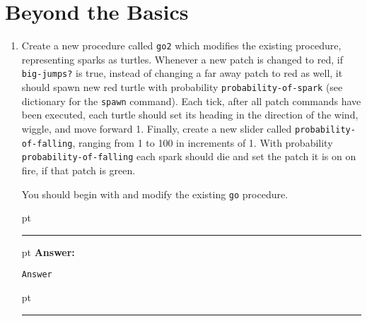 \documentclass[11pt,oneside]{book}
\begin{document}
\section{Beyond the Basics}
\begin{enumerate}

\item Create a new procedure called \texttt{go2} which modifies the existing procedure, representing sparks as turtles. Whenever a new patch is changed to red, if \texttt{big-jumps?} is true, instead of changing a far away patch to red as well, it should spawn new red turtle with probability \texttt{probability-of-spark} (see dictionary for the \texttt{spawn} command). Each tick, after all patch commands have been executed, each turtle should set its heading in the direction of the wind, wiggle, and move forward 1. Finally, create a new slider called \texttt{probability-of-falling}, ranging from 1 to 100 in increments of 1. With probability \texttt{probability-of-falling} each spark should die and set the patch it is on on fire, if that patch is green.

You should begin with and modify the existing \texttt{go} procedure.

\ifnum{}
 pt
\hrule
{} pt
{\bf Answer: }
\begin{verbatim}
Answer
\end{verbatim}
 pt
\hrule
\fi

\end{enumerate}

%
%

%
\end{document}
